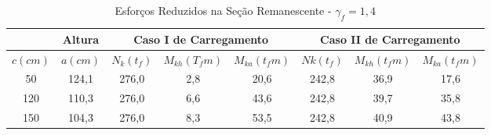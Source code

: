 \documentclass[12pt, a4paper, oneside]{article}
\begin{document}
\begin{table}[h!]
\centering
\caption{Esforços Reduzidos na Seção Remanescente - $\gamma_f = 1,4$}
{\selectfont %
\label{my-label}
\begin{tabular}{cccccccc}
\hline
\rowcolor[HTML]{C0C0C0} 
\multicolumn{1}{|c|}{\cellcolor[HTML]{C0C0C0}Fissura} & \multicolumn{1}{c|}{\cellcolor[HTML]{C0C0C0}Altura} & \multicolumn{3}{c|}{\cellcolor[HTML]{C0C0C0}Caso I de Carregamento}                                                                                   & \multicolumn{3}{c|}{\cellcolor[HTML]{C0C0C0}Caso II de Carregamento}                                                                                  \\ \hline
\multicolumn{1}{|c|}{$c (cm)$}                          & \multicolumn{1}{c|}{$a (cm)$}                         & \multicolumn{1}{c|}{$N_k (t_f)$}                    & \multicolumn{1}{c|}{$M_{kh} (T_fm)$}                   & \multicolumn{1}{c|}{$M_{ka} (t_fm)$}                   & \multicolumn{1}{c|}{$Nk (t_f)$}                    & \multicolumn{1}{c|}{$M_{kh} (t_fm)$}                   & \multicolumn{1}{c|}{$M_{ka} (t_fm)$}                   \\ \hline
\multicolumn{1}{|c|}{50}                              & \multicolumn{1}{c|}{124,1}                          & \multicolumn{1}{c|}{276,0}                      & \multicolumn{1}{c|}{2,8}                         & \multicolumn{1}{c|}{20,6}                        & \multicolumn{1}{c|}{242,8}                      & \multicolumn{1}{c|}{36,9}                        & \multicolumn{1}{c|}{17,6}                        \\ \hline
\multicolumn{1}{|c|}{120}                             & \multicolumn{1}{c|}{110,3}                          & \multicolumn{1}{c|}{276,0}                      & \multicolumn{1}{c|}{6,6}                         & \multicolumn{1}{c|}{43,6}                        & \multicolumn{1}{c|}{242,8}                      & \multicolumn{1}{c|}{39,7}                        & \multicolumn{1}{c|}{35,8}                        \\ \hline
\multicolumn{1}{|c|}{150}                             & \multicolumn{1}{c|}{104,3}                          & \multicolumn{1}{c|}{276,0}                      & \multicolumn{1}{c|}{8,3}                         & \multicolumn{1}{c|}{53,5}                        & \multicolumn{1}{c|}{242,8}                      & \multicolumn{1}{c|}{40,9}                        & \multicolumn{1}{c|}{43,8}                        \\ \hline

\end{tabular}}
\end{table}
\end{document}
